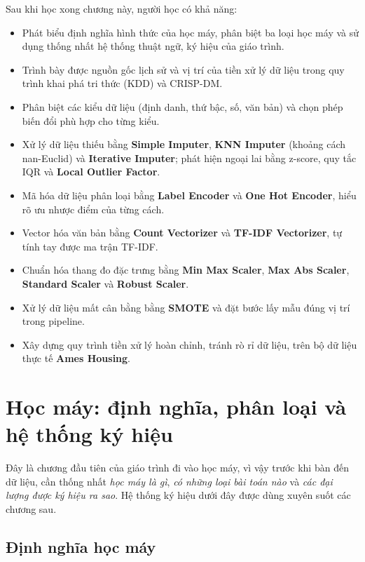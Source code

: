 \noindent Sau khi học xong chương này, người học có khả năng:
\begin{itemize}
    \item Phát biểu định nghĩa hình thức của học máy, phân biệt ba loại học máy và sử dụng thống nhất hệ thống thuật ngữ, ký hiệu của giáo trình.
    \item Trình bày được nguồn gốc lịch sử và vị trí của tiền xử lý dữ liệu trong quy trình khai phá tri thức (KDD) và CRISP-DM.
    \item Phân biệt các kiểu dữ liệu (định danh, thứ bậc, số, văn bản) và chọn phép biến đổi phù hợp cho từng kiểu.
    \item Xử lý dữ liệu thiếu bằng \textbf{Simple Imputer}, \textbf{KNN Imputer} (khoảng cách nan-Euclid) và \textbf{Iterative Imputer}; phát hiện ngoại lai bằng z-score, quy tắc IQR và \textbf{Local Outlier Factor}.
    \item Mã hóa dữ liệu phân loại bằng \textbf{Label Encoder} và \textbf{One Hot Encoder}, hiểu rõ ưu nhược điểm của từng cách.
    \item Vector hóa văn bản bằng \textbf{Count Vectorizer} và \textbf{TF-IDF Vectorizer}, tự tính tay được ma trận TF-IDF.
    \item Chuẩn hóa thang đo đặc trưng bằng \textbf{Min Max Scaler}, \textbf{Max Abs Scaler}, \textbf{Standard Scaler} và \textbf{Robust Scaler}.
    \item Xử lý dữ liệu mất cân bằng bằng \textbf{SMOTE} và đặt bước lấy mẫu đúng vị trí trong pipeline.
    \item Xây dựng quy trình tiền xử lý hoàn chỉnh, tránh rò rỉ dữ liệu, trên bộ dữ liệu thực tế \textbf{Ames Housing}.
\end{itemize}

\section{Học máy: định nghĩa, phân loại và hệ thống ký hiệu}
\label{sec:ml-basics}

Đây là chương đầu tiên của giáo trình đi vào học máy, vì vậy trước khi bàn đến dữ liệu, cần thống nhất \textit{học máy là gì}, \textit{có những loại bài toán nào} và \textit{các đại lượng được ký hiệu ra sao}. Hệ thống ký hiệu dưới đây được dùng xuyên suốt các chương sau.

\subsection{Định nghĩa học máy}

